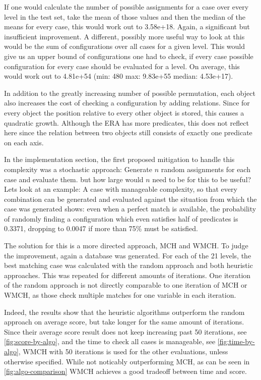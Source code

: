 If one would calculate the number of possible assignments for a case over every level in the test set, take the mean of those values and then the median of the means for every case, this would work out to 3.58e+18. Again, a significant but insufficient improvement.
A different, possibly more useful way to look at this would be the sum of configurations over all cases for a given level. This would give us an upper bound of configurations one had to check, if every case possible configuration for every case should be evaluated for a level. On average, this would work out to 4.81e+54 (min: 480 max: 9.83e+55 median: 4.53e+17).

In addition to the greatly increasing number of possible permutation, each object also increases the cost of checking a configuration by adding relations.
Since for every object the position relative to every other object is stored, this causes a quadratic growth. Although the ERA has more predicates, this does not reflect here since the relation between two objects still consists of exactly one predicate on each axis.


In the implementation section, the first proposed mitigation to handle this complexity was a stochastic approach: Generate $n$ random assignments for each case and evaluate them. but how large would $n$ need to be for this to be useful?
Lets look at an example: A case with manageable complexity, so that every combination can be generated and evaluated against the situation from which the case was generated shows: even when a perfect match is available, the probability of randomly finding a configuration which even satisfies half of predicates is 0.3371, dropping to 0.0047 if more than 75\% must be satisfied.


The solution for this is a more directed approach, \ac{MCH} and \ac{WMCH}. To judge the improvement, again a database was generated.
For each of the 21 levels, the best matching case was calculated with the random approach and both heuristic approaches. This was repeated for different amounts of iterations. One iteration of the random approach is not directly comparable to one iteration of \ac{MCH} or \ac{WMCH}, as those check multiple matches for one variable in each iteration.

Indeed, the results show that the heuristic algorithms outperform the random approach on average score, but take longer for the same amount of iterations. Since their average score result does not keep increasing past 50 iterations, see \ref{fig:score-by-algo}, and the time to check all cases is manageable, see \ref{fig:time-by-algo}, \ac{WMCH} with 50 iterations is used for the other evaluations, unless otherwise specified.
While not noticably outperforming \ac{MCH}, as can be seen in \ref{fig:algo-comparison} \ac{WMCH} achieves a good tradeoff between time and score.

